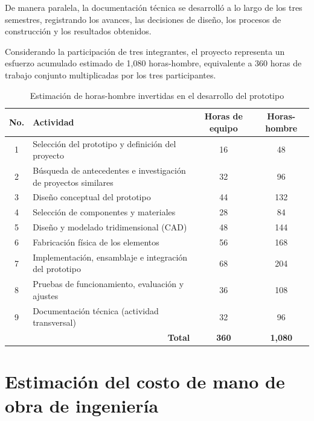 De manera paralela, la documentación técnica se desarrolló a lo largo de los tres semestres, registrando los avances, las decisiones de diseño, los procesos de construcción y los resultados obtenidos.

Considerando la participación de tres integrantes, el proyecto representa un esfuerzo acumulado estimado de 1,080 horas-hombre, equivalente a 360 horas de trabajo conjunto multiplicadas por los tres participantes.

\newpage

\begin{table}[H]
    \centering
    \label{tab:horas_proyecto}
    \renewcommand{\arraystretch}{1.2}
    \begin{tabular}{|c|p{7.5cm}|c|c|}
        \hline
        \textbf{No.} & \textbf{Actividad} & \textbf{Horas de equipo} & \textbf{Horas-hombre} \\ \hline
        1 & Selección del prototipo y definición del proyecto & 16 & 48 \\ \hline
        2 & Búsqueda de antecedentes e investigación de proyectos similares & 32 & 96 \\ \hline
        3 & Diseño conceptual del prototipo & 44 & 132 \\ \hline
        4 & Selección de componentes y materiales & 28 & 84 \\ \hline
        5 & Diseño y modelado tridimensional (CAD) & 48 & 144 \\ \hline
        6 & Fabricación física de los elementos & 56 & 168 \\ \hline
        7 & Implementación, ensamblaje e integración del prototipo & 68 & 204 \\ \hline
        8 & Pruebas de funcionamiento, evaluación y ajustes & 36 & 108 \\ \hline
        9 & Documentación técnica (actividad transversal) & 32 & 96 \\ \hline
        \multicolumn{2}{|r|}{\textbf{Total}} & \textbf{360} & \textbf{1,080} \\ \hline
    \end{tabular}
    \caption{Estimación de horas-hombre invertidas en el desarrollo del prototipo}
\end{table}

\newpage
\section{Estimación del costo de mano de obra de ingeniería}


